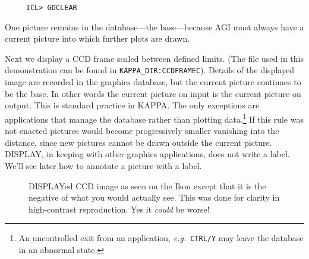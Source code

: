 \small
\begin{verbatim}
     ICL> GDCLEAR
\end{verbatim}
\normalsize

One picture remains in the database---the base---because AGI must
always have a current picture into which further plots are drawn.

Next we display a CCD frame scaled between defined limits.  (The file
used in this demonstration can be found in {\tt KAPPA\_DIR:CCDFRAMEC}).
Details of the displayed image are recorded in the graphics database, but
the current picture continues to be the base.  In other words the current
picture on input is the current picture on output.  This is standard
practice in {\small KAPPA}.  The only exceptions are applications that
manage the database rather than plotting data.\footnote{An uncontrolled
exit from an application, {\it e.g.}\ {\tt CTRL/Y} may leave the database
in an  abnormal state.} If this rule was not enacted pictures would become
progressively smaller vanishing into the distance, since new pictures
cannot be drawn outside the current picture.  DISPLAY, in keeping with
other graphics applications, does not write a label.  We'll see later
how to annotate a picture with a label.

\begin{figure}[hbt]
\caption{DISPLAYed CCD image as seen on the Ikon except that it is the
negative of what you would actually see.  This was done for clarity in
high-contrast reproduction.  Yes it {\em could\/} be worse!}
\label{fi:agi1}
\vspace{4.4in}
\end{figure}

